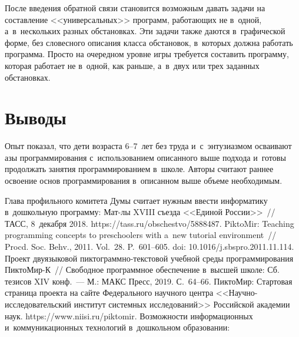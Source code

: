 \begin{multicols}{2}
{}
  
   После введения обратной связи становится возможным давать задачи на 
составление <<универсальных>> программ, работающих не в~одной, 
а~в~нескольких разных обстановках. Эти задачи также даются в~графической 
форме, без словесного описания класса обстановок, в~которых должна работать 
программа. Просто на очередном уровне игры требуется составить программу, 
которая работает не в~одной, как раньше, а~в~двух или трех заданных 
обстановках. 

\vspace*{-10pt}
  
\section{Выводы}

\vspace*{-2pt}

  Опыт показал, что дети возраста 6--7~лет без труда и~с~энтузиазмом 
осваивают азы программирования с~использованием описанного выше подхода 
и~готовы продолжать занятия программированием в~школе. Авторы считают  
раннее освоение основ программирования в~описанном выше объеме
необходимым.


{\small\frenchspacing
 {%
 \begin{thebibliography}{9}
 
 
Глава профильного комитета Думы считает нужным ввести информатику в~дошкольную 
программу:  Мат-лы XVIII съезда <<Единой России>>~// ТАСС, 8~декабря 2018. {\sf 
https://tass.ru/obschestvo/5888487}.
 PiktoMir: Teaching programming concepts to preschoolers with 
a~new tutorial environment~// Procd.  Soc. Behv., 2011. Vol.~28.  
P.~601--605. doi: 10.1016/j.sbspro.2011.11.114.
 Проект 
двуязыковой пик\-то\-грам\-мно-текс\-то\-вой учебной среды программирования ПиктоМир-К~// 
Свободное программное обеспечение в~высшей школе: Сб. тезисов XIV конф.~--- 
М.: МАКС Пресс, 2019. С.~64--66.
ПиктоМир: Стартовая страница проекта на сайте Федерального научного центра  
<<На\-уч\-но-ис\-сле\-до\-ва\-тель\-ский институт системных исследований>> Российской 
академии наук. {\sf https://www.niisi.ru/piktomir}.
 Возможности информационных и~коммуникационных технологий 
в~дошкольном образовании:\linebreak\vspace*{-12pt}


\end{thebibliography}}}
\end{multicols}
